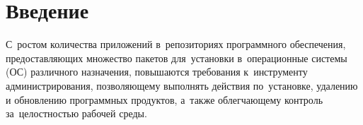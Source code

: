 
\section*{Введение}

С~ростом количества приложений в~репозиториях программного обеспечения, 
предоставляющих множество  пакетов для~установки в~операционные системы (ОС) различного назначения,
повышаются требования к~инструменту администрирования,
позволяющему выполнять действия по~установке, удалению и обновлению программных продуктов,
а~также облегчающему контроль за~целостностью  рабочей среды.
